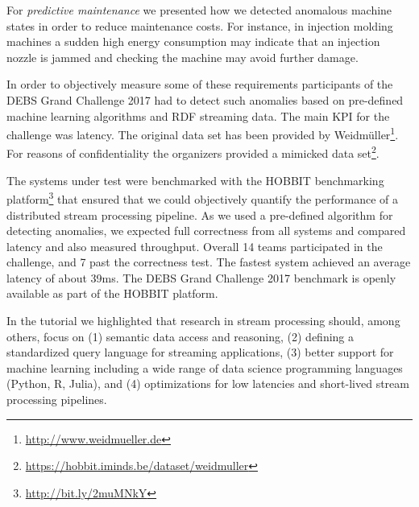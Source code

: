 For \emph{predictive maintenance} we presented how we detected anomalous machine states in order to reduce maintenance costs. For instance, in injection molding machines a sudden high energy consumption may indicate that an injection nozzle is jammed and checking the machine may avoid further damage. 

In order to objectively measure some of these requirements participants of the DEBS Grand Challenge 2017 \cite{gulisano_et_al_2017} had to detect such anomalies based on pre-defined machine learning algorithms and RDF streaming data. The main KPI for the challenge was latency. The original data set has been provided by Weidmüller\footnote{\url{http://www.weidmueller.de}}. For reasons of confidentiality the organizers provided a mimicked data set\footnote{\url{https://hobbit.iminds.be/dataset/weidmuller}}.


The systems under test were benchmarked with the HOBBIT benchmarking platform\footnote{\url{http://bit.ly/2muMNkY}} that ensured that we could objectively quantify the performance of a distributed stream processing pipeline. As we used a pre-defined algorithm for detecting anomalies, we expected full correctness from all systems and compared latency and also measured throughput. Overall 14 teams participated in the challenge,  and 7 past the correctness test. The fastest system \cite{amariei_et_al_2017} achieved an average latency of about 39ms. The DEBS Grand Challenge 2017 benchmark is openly available as part of the HOBBIT platform. 

In the tutorial we highlighted that research in stream processing should, among others, focus on (1) semantic data access and reasoning, (2) defining a standardized query language for streaming applications, (3) better support for machine learning including a wide range of data science programming languages (Python, R, Julia), and (4) optimizations for low latencies and short-lived stream processing pipelines.

